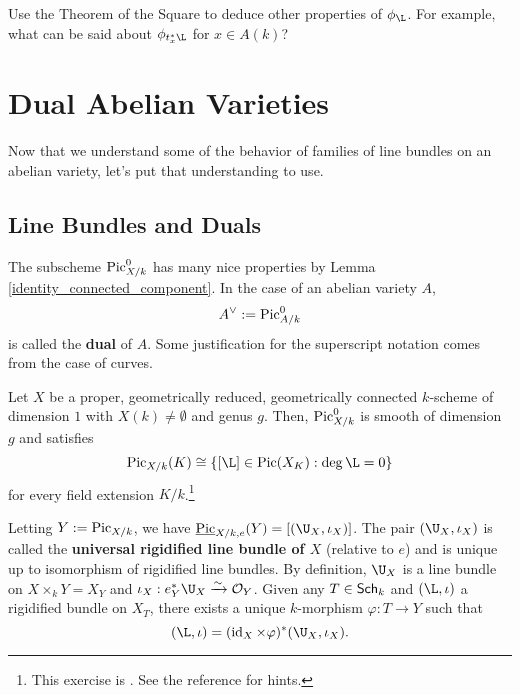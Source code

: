 \documentclass[11pt]{article}
\begin{document}
\begin{exercise}
Use the Theorem of the Square to deduce other properties of $\phi_{\L}$. For example, what can be said about $\phi_{t_x^*\L}$ for $x\in A(k)$?
\end{exercise}

\section{Dual Abelian Varieties}
Now that we understand some of the behavior of families of line bundles on an abelian variety, let's put that understanding to use.

\subsection{Line Bundles and Duals}
The subscheme $\operatorname{Pic}_{X/k}^0$ has many nice properties by Lemma \ref{identity_connected_component}. In the case of an abelian variety $A$, 
$$A^{\vee}:=\operatorname{Pic}_{A/k}^0$$ 
is called the \textbf{dual} of $A$. Some justification for the superscript notation comes from the case of curves.

\begin{exercise}\label{degree_zero}
Let $X$ be a proper, geometrically reduced, geometrically connected $k$-scheme of dimension $1$ with $X(k)\neq\emptyset$ and genus $g$. Then, $\operatorname{Pic}_{X/k}^0$ is smooth of dimension $g$ and satisfies
$$\Pic_{X/k}(K)\iso\{[\L]\in\Pic(X_K) : \deg\L=0\}$$
for every field extension $K/k$.\footnote{This exercise is \cite[\textrm{Exercise 2.4.3}]{Conrad}. See the reference for hints.}
\end{exercise}

Letting $Y:=\operatorname{Pic}_{X/k}$, we have $\underline{\Pic}_{X/k,e}(Y)=[(\U_X,\iota_X)]$. The pair $(\U_X,\iota_X)$ is called the \textbf{universal rigidified line bundle of $X$} (relative to $e$) and is unique up to isomorphism of rigidified line bundles. By definition, $\U_X$ is a line bundle on $X\times_kY=X_Y$ and $\iota_X: e_Y^*\U_X\xto{\sim}\O_Y$. Given any $T\in\operatorname{\mathsf{Sch}}_k$ and $(\L,\iota)$ a rigidified bundle on $X_T$, there exists a unique $k$-morphism $\varphi: T\to Y$ such that 
$$(\L,\iota)=(\id_X\times\varphi)^*(\U_X,\iota_X).$$
\end{document}
